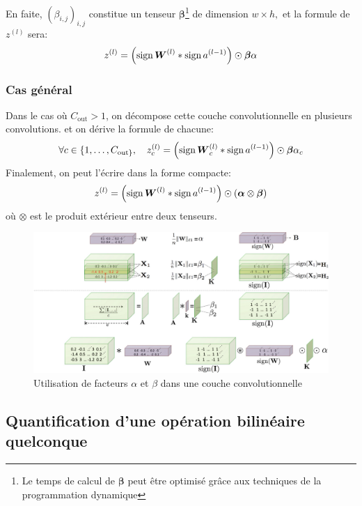 En faite, $(\beta_{i,j})_{i,j}$ constitue un tenseur $\boldsymbol{\beta}$\footnote{Le temps de calcul de $\boldsymbol{\beta}$ peut être optimisé grâce aux techniques de la programmation dynamique} de dimension $w\times h,$ et la formule de $z^{(l)}$ sera:
\begin{equation} \label{XnorNet:Conv}
	z^{(l)}=\left(\operatorname{sign} \boldsymbol{W}^{(l)} * \operatorname{sign} a^{(l-1)}\right) \odot \boldsymbol{\beta}\alpha
\end{equation}

\subsubsection{Cas général}
Dans le cas où $C_{\text{out}}>1$, on décompose cette couche convolutionnelle en plusieurs convolutions. et on dérive la formule de chacune:
\begin{equation}
	\forall c\in\{1,\dots, C_{\text{out}\}},\quad z_c^{(l)} = \left(\operatorname{sign} \boldsymbol{W}_c^{(l)} * \operatorname{sign} a^{(l-1)}\right) \odot \boldsymbol{\beta}\alpha_c
\end{equation}
Finalement, on peut l'écrire dans la forme compacte:
\begin{equation}
	z^{(l)} = \left(\operatorname{sign} \boldsymbol{W}^{(l)} * \operatorname{sign} a^{(l-1)}\right) \odot \left(\boldsymbol{\alpha} \otimes \boldsymbol{\beta}\right)
\end{equation}
où $\otimes$ est le produit extérieur entre deux tenseurs.

\begin{figure}[h!]
	\centering
	\includegraphics[width=1\textwidth]{Figures/XNOR-Conv2D.png}
	\caption{Utilisation de facteurs $\alpha$ et $\beta$ dans une couche convolutionnelle}
	\label{fig:XNOR-Conv}
\end{figure}
\FloatBarrier
\subsection{Quantification d'une opération bilinéaire quelconque}\label{XnorNet:BilinearForm}
